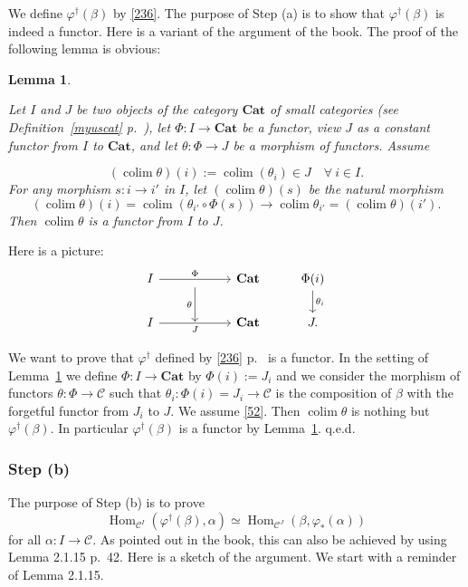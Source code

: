 \documentclass[12pt]{article}
\newtheorem{lem}[thm]{Lemma}
\theoremstyle{remark}
\theoremstyle{definition}
\newcommand{\C}{\mathcal C}
\newcommand{\Cat}{\mathbf{Cat}}
\newcommand{\pp}{\varphi}
\DeclareMathOperator*{\colim}{colim}
\DeclareMathOperator{\Hom}{Hom}
\begin{document}
We define $\pp^\dagger(\beta)$ by \eqref{236}. The purpose of Step (a) is to show that $\pp^\dagger(\beta)$ is indeed a functor. Here is a variant of the argument of the book. The proof of the following lemma is obvious: 

\begin{lem}\label{r52}

Let $I$ and $J$ be two objects of the category $\Cat$ of small categories (see Definition~\ref{myuscat} p.~\pageref{myuscat}), let $\Phi:I\to\Cat$ be a functor, view $J$ as a constant functor from $I$ to $\Cat$, and let $\theta:\Phi\to J$ be a morphism of functors. Assume 

\begin{equation}\label{52} 
(\colim\theta)(i):=\colim(\theta_i)\in J\quad\forall\ i\in I. 
\end{equation} 
%
For any morphism $s:i\to i'$ in $I$, let $(\colim\theta)(s)$ be the natural morphism 
$$
(\colim\theta)(i)=\colim(\theta_{i'}\circ\Phi(s))\to
\colim\theta_{i'}=(\colim\theta)(i'). 
$$ 
Then $\colim\theta$ is a functor from $I$ to $J$. 
%
\end{lem}
%
Here is a picture:
$$
\begin{tikzcd}
I\ar{rr}{\Phi}&\ar{d}[swap]{\theta}&\Cat&\Phi(i)\ar{d}{\theta_i}\\ 
I\ar{rr}[swap]{J}&{}&\Cat&J.
\end{tikzcd}
$$

We want to prove that $\pp^\dagger$ defined by \eqref{236} p.~\pageref{236} is a functor. In the setting of Lemma~\ref{r52} we define $\Phi:I\to\Cat$ by $\Phi(i):=J_i$ and we consider the morphism of functors $\theta:\Phi\to\C$ such that $\theta_i:\Phi(i)=J_i\to\C$ is the composition of $\beta$ with the forgetful functor from $J_i$ to $J$. We assume \eqref{52}. Then $\colim\theta$ is nothing but $\pp^\dagger(\beta)$. In particular $\pp^\dagger(\beta)$ is a functor by Lemma~\ref{r52}. q.e.d.

%

\subsubsection{Step (b)}

The purpose of Step (b) is to prove 
\begin{equation}\label{stepb}
\Hom_{\C^I}(\pp^\dagger(\beta),\alpha)\simeq\Hom_{\C^J}(\beta,\pp_*(\alpha)) 
\end{equation} 
for all $\alpha:I\to\C$. As pointed out in the book, this can also be achieved by using Lemma 2.1.15 p.~42. Here is a sketch of the argument. We start with a reminder of Lemma 2.1.15. 
\end{document}
